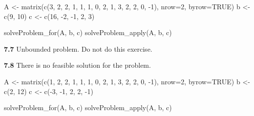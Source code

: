 \documentclass[
]{article}
\newenvironment{Shaded}{\begin{snugshade}}{\end{snugshade}}
\newcommand{\AttributeTok}[1]{\textcolor[rgb]{0.77,0.63,0.00}{#1}}
\newcommand{\ConstantTok}[1]{\textcolor[rgb]{0.00,0.00,0.00}{#1}}
\newcommand{\DecValTok}[1]{\textcolor[rgb]{0.00,0.00,0.81}{#1}}
\newcommand{\FunctionTok}[1]{\textcolor[rgb]{0.00,0.00,0.00}{#1}}
\newcommand{\NormalTok}[1]{#1}
\newcommand{\OtherTok}[1]{\textcolor[rgb]{0.56,0.35,0.01}{#1}}
\newcommand{\SpecialCharTok}[1]{\textcolor[rgb]{0.00,0.00,0.00}{#1}}
\begin{document}
\begin{Shaded}
\begin{Highlighting}[]
\NormalTok{A }\OtherTok{\textless{}{-}} \FunctionTok{matrix}\NormalTok{(}\FunctionTok{c}\NormalTok{(}\DecValTok{3}\NormalTok{, }\DecValTok{2}\NormalTok{, }\DecValTok{2}\NormalTok{, }\DecValTok{1}\NormalTok{, }\DecValTok{1}\NormalTok{, }\DecValTok{1}\NormalTok{, }\DecValTok{0}\NormalTok{, }\DecValTok{2}\NormalTok{, }\DecValTok{1}\NormalTok{, }\DecValTok{3}\NormalTok{, }\DecValTok{2}\NormalTok{, }\DecValTok{2}\NormalTok{, }\DecValTok{0}\NormalTok{, }\SpecialCharTok{{-}}\DecValTok{1}\NormalTok{), }\AttributeTok{nrow=}\DecValTok{2}\NormalTok{, }\AttributeTok{byrow=}\ConstantTok{TRUE}\NormalTok{)}
\NormalTok{b }\OtherTok{\textless{}{-}} \FunctionTok{c}\NormalTok{(}\DecValTok{9}\NormalTok{, }\DecValTok{10}\NormalTok{)}
\NormalTok{c }\OtherTok{\textless{}{-}} \FunctionTok{c}\NormalTok{(}\DecValTok{16}\NormalTok{, }\SpecialCharTok{{-}}\DecValTok{2}\NormalTok{, }\SpecialCharTok{{-}}\DecValTok{1}\NormalTok{, }\DecValTok{2}\NormalTok{, }\DecValTok{3}\NormalTok{)}

\FunctionTok{solveProblem\_for}\NormalTok{(A, b, c)}
\FunctionTok{solveProblem\_apply}\NormalTok{(A, b, c)}
\end{Highlighting}
\end{Shaded}

\textbf{7.7} Unbounded problem. Do not do this exercise.

\textbf{7.8} There is no feasible solution for the problem.

\begin{Shaded}
\begin{Highlighting}[]
\NormalTok{A }\OtherTok{\textless{}{-}} \FunctionTok{matrix}\NormalTok{(}\FunctionTok{c}\NormalTok{(}\DecValTok{1}\NormalTok{, }\DecValTok{2}\NormalTok{, }\DecValTok{2}\NormalTok{, }\DecValTok{1}\NormalTok{, }\DecValTok{1}\NormalTok{, }\DecValTok{1}\NormalTok{, }\DecValTok{0}\NormalTok{, }\DecValTok{2}\NormalTok{, }\DecValTok{1}\NormalTok{, }\DecValTok{3}\NormalTok{, }\DecValTok{2}\NormalTok{, }\DecValTok{2}\NormalTok{, }\DecValTok{0}\NormalTok{, }\SpecialCharTok{{-}}\DecValTok{1}\NormalTok{), }\AttributeTok{nrow=}\DecValTok{2}\NormalTok{, }\AttributeTok{byrow=}\ConstantTok{TRUE}\NormalTok{)}
\NormalTok{b }\OtherTok{\textless{}{-}} \FunctionTok{c}\NormalTok{(}\DecValTok{2}\NormalTok{, }\DecValTok{12}\NormalTok{)}
\NormalTok{c }\OtherTok{\textless{}{-}} \FunctionTok{c}\NormalTok{(}\SpecialCharTok{{-}}\DecValTok{3}\NormalTok{, }\SpecialCharTok{{-}}\DecValTok{1}\NormalTok{, }\DecValTok{2}\NormalTok{, }\DecValTok{2}\NormalTok{, }\SpecialCharTok{{-}}\DecValTok{1}\NormalTok{)}

\FunctionTok{solveProblem\_for}\NormalTok{(A, b, c)}
\FunctionTok{solveProblem\_apply}\NormalTok{(A, b, c)}
\end{Highlighting}
\end{Shaded}
\end{document}

